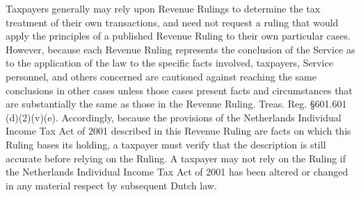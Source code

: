 \begin{select}
Taxpayers generally may rely upon Revenue Rulings to determine the tax treatment of their own transactions, and need 
not request a ruling that would apply the principles of a published Revenue Ruling to their own particular cases. However, 
because each Revenue Ruling represents the conclusion of the Service as to the application of the law to the specific 
facts involved, taxpayers, Service personnel, and others concerned are cautioned against reaching the same conclusions 
in other cases unless those cases present facts and circumstances that are substantially the same as those in the Revenue 
Ruling. Treas. Reg. \S 601.601 (d)(2)(v)(e). Accordingly, because the provisions of the Netherlands Individual Income Tax 
Act of 2001 described in this Revenue Ruling are facts on which this Ruling bases its holding, a taxpayer must verify that 
the description is still accurate before relying on the Ruling. A taxpayer may not rely on the Ruling if the Netherlands 
Individual Income Tax Act of 2001 has been altered or changed in any material respect by subsequent Dutch law. 
\end{select}

 
 
